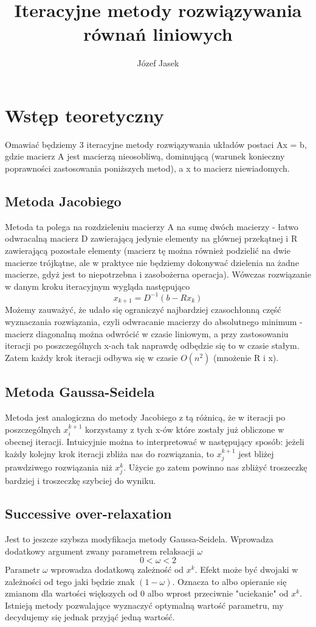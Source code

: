 \documentclass{article}
\title{Iteracyjne metody rozwiązywania równań liniowych}
\author{Józef Jasek}
\begin{document}
\maketitle

\section{Wstęp teoretyczny}
Omawiać będziemy 3 iteracyjne metody rozwiązywania układów postaci Ax = b, gdzie macierz A jest macierzą nieosobliwą, dominującą (warunek konieczny poprawności zastosowania poniższych metod), a x to macierz niewiadomych.
\subsection{Metoda Jacobiego}
Metoda ta polega na rozdzieleniu macierzy A na sumę dwóch macierzy - łatwo odwracalną macierz D zawierającą jedynie elementy na głównej przekątnej i R zawierającą pozostałe elementy (macierz tę można również podzielić na dwie macierze trójkątne, ale w praktyce nie będziemy dokonywać dzielenia na żadne macierze, gdyż jest to niepotrzebna i zasobożerna operacja). Wówczas rozwiązanie w danym kroku iteracyjnym wygląda następująco
\[ x_{k+1} = D^{-1}(b-Rx_k) \]
Możemy zauważyć, że udało się ograniczyć najbardziej czasochłonną część wyznaczania rozwiązania, czyli odwracanie macierzy do absolutnego minimum - macierz diagonalną można odwrócić w czasie liniowym, a przy zastosowaniu iteracji po poszczególnych x-ach tak naprawdę odbędzie się to w czasie stałym. Zatem każdy krok iteracji odbywa się w czasie $O(n^2)$ (mnożenie R i x).
\subsection{Metoda Gaussa-Seidela}
Metoda jest analogiczna do metody Jacobiego z tą różnicą, że w iteracji po poszczególnych $x^{k+1}_{i}$ korzystamy z tych x-ów które zostały już obliczone w obecnej iteracji. Intuicyjnie można to interpretować w następujący sposób: jeżeli każdy kolejny krok iteracji zbliża nas do rozwiązania, to $x^{k+1}_{j}$ jest bliżej prawdziwego rozwiązania niż $x^{k}_{j}$. Użycie go zatem powinno nas zbliżyć troszeczkę bardziej i troszeczkę szybciej do wyniku.
\subsection{Successive over-relaxation}
Jest to jeszcze szybsza modyfikacja metody Gaussa-Seidela. Wprowadza dodatkowy argument zwany parametrem relaksacji $\omega$
\[ 0 < \omega < 2 \]
Parametr $\omega$ wprowadza dodatkową zależność od $x^{k}$. Efekt może być dwojaki w zależności od tego jaki będzie znak $(1-\omega)$. Oznacza to albo opieranie się zmianom dla wartości większych od 0 albo wprost przeciwnie "uciekanie" od $x^{k}$. Istnieją metody pozwalające wyznaczyć optymalną wartość parametru, my decydujemy się jednak przyjąć jedną wartość.
\end{document}
